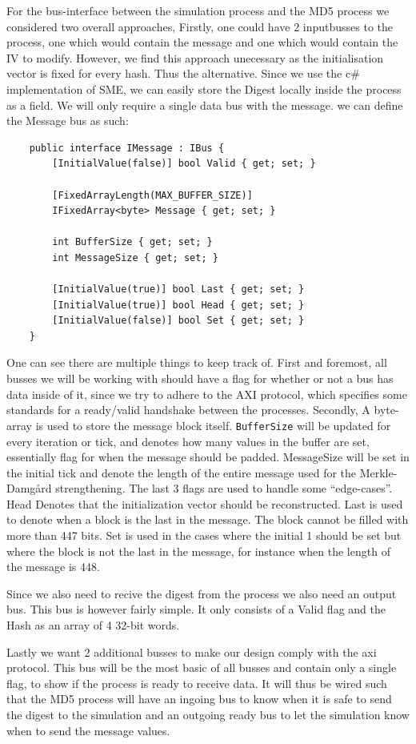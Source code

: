 \documentclass[a4paper]{article}
\begin{document}
For the bus-interface between the simulation process and the MD5 process we considered two overall approaches,
Firstly, one could have 2 inputbusses to the process, one which would contain the message and one which would contain the IV to modify. However, we find this approach unecessary as the initialisation vector is fixed for every hash. Thus the alternative. Since we use the c\# implementation of SME, we can easily store the Digest locally inside the process as a field. We will only require a single data bus with the message. we can define the Message bus as such:
\begin{verbatim}
    public interface IMessage : IBus {
        [InitialValue(false)] bool Valid { get; set; }

        [FixedArrayLength(MAX_BUFFER_SIZE)]
        IFixedArray<byte> Message { get; set; }

        int BufferSize { get; set; }
        int MessageSize { get; set; }

        [InitialValue(true)] bool Last { get; set; }
        [InitialValue(true)] bool Head { get; set; }
        [InitialValue(false)] bool Set { get; set; }
    }
\end{verbatim}
One can see there are multiple things to keep track of. First and foremost, all busses we will be working with should have a flag for whether or not a bus has data inside of it, since we try to adhere to the AXI protocol, which specifies some standards for a ready/valid handshake between the processes. Secondly, A byte-array is used to store the message block itself. \texttt{BufferSize} will be updated for every iteration or tick, and denotes how many values in the buffer are set, essentially flag for when the message should be padded. MessageSize will be set in the initial tick and denote the length of the entire message used for the Merkle-Damgård strengthening.
The last 3 flags are used to handle some ``edge-cases''.
Head Denotes that the initialization vector should be reconstructed.
Last is used to denote when a block is the last in the message. The block cannot be filled with more than 447 bits.
Set is used in the cases where the initial 1 should be set but where the block is not the last in the message, for instance when the length of the message is 448.

Since we also need to recive the digest from the process we also need an output bus. This bus is however fairly simple. It only consists of a Valid flag and the Hash as an array of 4 32-bit words.

Lastly we want 2 additional busses to make our design comply with the axi protocol. This bus will be the most basic of all busses and contain only a single flag, to show if the process is ready to receive data. It will thus be wired such that the MD5 process will have an ingoing bus to know when it is safe to send the digest to the simulation and an outgoing ready bus to let the simulation know when to send the message values.
\end{document}
